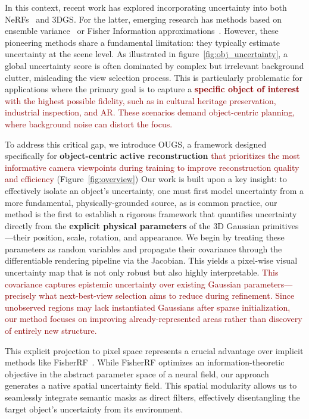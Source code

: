 \documentclass{egpubl}
\newcommand{\pname}[1]{{OUGS}}
\newcommand{\rev}[1]{\textcolor{darkred}{#1}}
\begin{document}
In this context, recent work has explored incorporating uncertainty into both NeRFs~\cite{goli2023,klassonSourcesUncertainty3D2024} and 3DGS. For the latter, emerging research has methods based on ensemble variance~\cite{hanViewDependentUncertaintyEstimation2025} or Fisher Information approximations~\cite{jiangFisherRFActiveView2024}. However, these pioneering methods share a fundamental limitation: they typically estimate uncertainty at the scene level. As illustrated in figure~\ref{fig:obj_uncertainty}, a global uncertainty score is often dominated by complex but irrelevant background clutter, misleading the view selection process. This is particularly problematic for applications where the primary goal is to capture a \rev{\textbf{specific object of interest} with the highest possible fidelity, such as in cultural heritage preservation, industrial inspection, and AR. These scenarios demand object-centric planning, where background noise can distort the focus.}

To address this critical gap, we introduce \pname{}, a framework designed specifically for \textbf{object-centric active reconstruction} \rev{that prioritizes the most informative camera viewpoints during training to improve reconstruction quality and efficiency} (Figure~\ref{fig:overview})
Our work is built upon a key insight: to effectively isolate an object's uncertainty, one must first model uncertainty from a more fundamental, physically-grounded source, as is common practice, our method is the first to establish a rigorous framework that quantifies uncertainty directly from the \textbf{explicit physical parameters} of the 3D Gaussian primitives—their position, scale, rotation, and appearance. We begin by treating these parameters as random variables and propagate their covariance through the differentiable rendering pipeline via the Jacobian. This yields a pixel-wise visual uncertainty map that is not only robust but also highly interpretable.
\rev{This covariance captures epistemic uncertainty over existing Gaussian parameters—precisely what next-best-view selection aims to reduce during refinement. Since unobserved regions may lack instantiated Gaussians after sparse initialization, our method focuses on improving already-represented areas rather than discovery of entirely new structure.}

This explicit projection to pixel space represents a crucial advantage over implicit methods like FisherRF~\cite{jiangFisherRFActiveView2024}. While FisherRF optimizes an information-theoretic objective in the abstract parameter space of a neural field, our approach generates a native spatial uncertainty field. This spatial modularity allows us to seamlessly integrate semantic masks as direct filters, effectively disentangling the target object's uncertainty from its environment.
\end{document}
